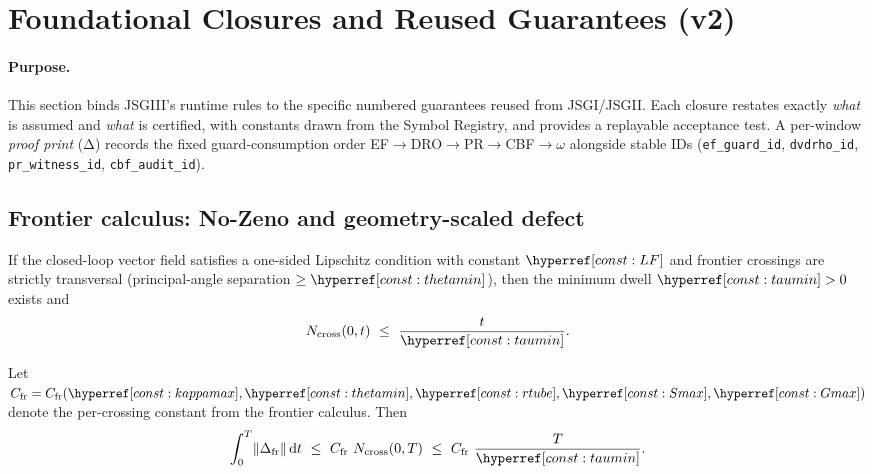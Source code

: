 \section{Foundational Closures and Reused Guarantees (v2)}\label{sec:closures-v2}

\paragraph{Purpose.}
This section binds JSGIII’s runtime rules to the specific numbered guarantees reused from JSGI/JSGII. Each closure restates exactly \emph{what} is assumed and \emph{what} is certified, with constants drawn from the Symbol Registry, and provides a replayable acceptance test. A per-window \emph{proof print} (Δ) records the fixed guard-consumption order EF$\rightarrow$DRO$\rightarrow$PR$\rightarrow$CBF$\rightarrow\omega$ alongside stable IDs (\texttt{ef\_guard\_id}, \texttt{dvdrho\_id}, \texttt{pr\_witness\_id}, \texttt{cbf\_audit\_id}).

\subsection{Frontier calculus: No-Zeno and geometry-scaled defect}\label{subsec:frontier-closure}
\emph{}

\begin{lemma}\label{lem:nozeno-impl}
If the closed-loop vector field satisfies a one-sided Lipschitz condition with constant $\constref{LF}$ and frontier crossings are strictly transversal (principal-angle separation $\ge \constref{thetamin}$), then the minimum dwell $\constref{taumin}>0$ exists and
\[
N_{\mathrm{cross}}(0,t)\ \le\ \frac{t}{\constref{taumin}}.
\]
\end{lemma}

\begin{lemma}\label{lem:jacobi-upgraded}
Let $C_{\mathrm{fr}}=C_{\mathrm{fr}}(\constref{kappamax},\constref{thetamin},\constref{rtube},\constref{Smax},\constref{Gmax})$ denote the per-crossing constant from the frontier calculus. Then
\[
\int_0^T\!\|\Delta_{\mathrm{fr}}\|\,\mathrm dt\ \le\ C_{\mathrm{fr}}\ N_{\mathrm{cross}}(0,T)
\ \le\ C_{\mathrm{fr}}\ \frac{T}{\constref{taumin}}.
\]
\end{lemma}

